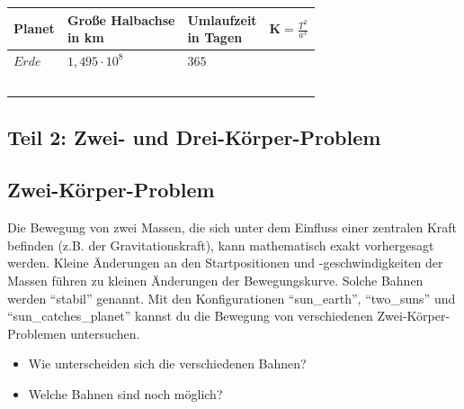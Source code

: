 \documentclass{scrartcl}
\begin{document}
        \renewcommand{\arraystretch}{1.6}
        \begin{tabularx}{\textwidth}{|X|X|X|X|}
        \hline
        \textbf{Planet} & \makecell{\textbf{Große Halbachse}\\ in km} & \makecell{\textbf{Umlaufzeit}\\ in Tagen} & $\mathbf{K}=\frac{T^ 2}{a^3}$ \\
        \hline
        $\mathit{Erde}$ & $\mathit{1,495\cdot 10^8}$  & $\mathit{365}$ &  \\
        \hline
        &  &  &  \\
        \hline
        &  &  &  \\
        \hline
        &  &  &  \\
        \hline
        &  &  &  \\
        \hline
        &  &  &  \\
        \hline
        \end{tabularx}
        \renewcommand{\arraystretch}{1.0}
        

        \newpage
        \subsection*{Teil 2: Zwei- und Drei-Körper-Problem}
        \phantom{asfda}
        \subsection*{Zwei-Körper-Problem}
        Die Bewegung von zwei Massen, die sich unter dem Einfluss einer zentralen Kraft befinden (z.B. der Gravitationskraft), kann mathematisch exakt vorhergesagt werden.
        Kleine Änderungen an den Startpositionen und -geschwindigkeiten der Massen führen zu kleinen Änderungen der Bewegungskurve. Solche Bahnen werden "`stabil"' genannt.
        Mit den Konfigurationen "`sun\_earth"', "`two\_suns"' und "`sun\_catches\_planet"' kannst du die Bewegung von verschiedenen Zwei-Körper-Problemen untersuchen.
        
    \begin{itemize}
        \item Wie unterscheiden sich die verschiedenen Bahnen? 
        \item Welche Bahnen sind noch möglich?
    \end{itemize}
\end{document}
